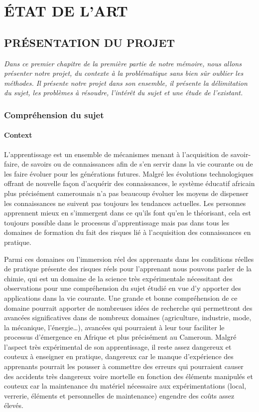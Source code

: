 \part{ÉTAT DE L’ART}
\chapter{PRÉSENTATION DU PROJET}

\textit{Dans ce premier chapitre de la première partie de notre mémoire, nous allons présenter
	notre projet, du contexte à la problématique sans bien sûr oublier les méthodes. Il présente
	notre projet dans son ensemble, il présente la délimitation du sujet, les problèmes à résoudre,
	l’intérêt du sujet et une étude de l’existant.}

\clearpage

\section{Compréhension du sujet}

\subsection{Context}

L’apprentissage est un ensemble de mécanismes menant à l'acquisition de savoir-faire, de savoirs ou de connaissances afin de s’en servir dans la vie courante ou de les faire évoluer pour les générations futures. Malgré les évolutions technologiques offrant de nouvelle façon d’acquérir des connaissances, le système éducatif africain plus précisément camerounais n’a pas beaucoup évoluer les moyens de dispenser les connaissances ne suivent pas toujours les tendances actuelles. Les personnes apprennent mieux en s’immergent dans ce qu’ils font qu’en le théorisant, cela est toujours possible dans le processus d’apprentissage mais pas dans tous les domaines de formation du fait des risques lié à l’acquisition des connaissances en pratique.

Parmi ces domaines ou l’immersion réel des apprenants dans les conditions réelles de pratique présente des risques réels pour l’apprenant nous pouvons parler de la chimie, qui est un domaine de la science très expérimentale nécessitant des observations pour une compréhension du sujet étudié en vue d’y apporter des applications dans la vie courante. Une grande et bonne compréhension de ce domaine pourrait apporter de nombreuses idées de recherche qui permettront des avancées significatives dans de nombreux domaines (agriculture, industrie, mode, la mécanique, l'énergie…), avancées qui pourraient à leur tour faciliter le processus d'émergence en Afrique et plus précisément au Cameroun. Malgré l'aspect très expérimental de son apprentissage, il reste assez dangereux et couteux à enseigner en pratique, dangereux car le manque d’expérience des apprenants pourrait les pousser à commettre des erreurs qui pourraient causer des accidents très dangereux voire mortelle en fonction des éléments manipulés et couteux car la maintenance du matériel nécessaire aux expérimentations (local, verrerie, éléments et personnelles de maintenance) engendre des coûts assez élevés.

